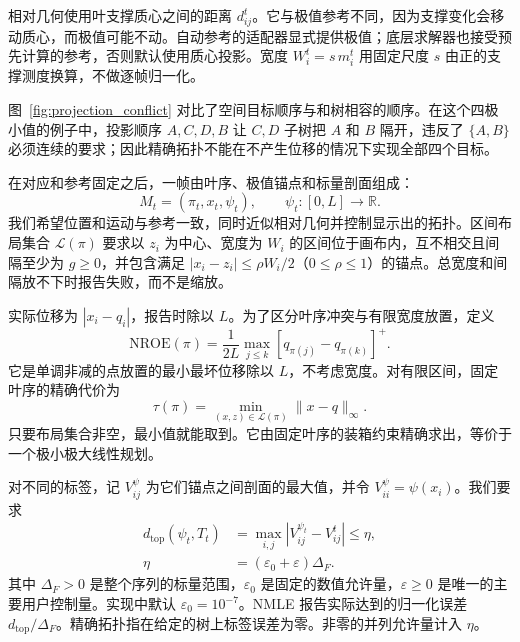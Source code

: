 \documentclass[fontset=none,zihao=5,a4paper]{ctexart}
\newcommand{\dtop}{d_{\mathrm{top}}}
\newcommand{\nroe}{\mathrm{NROE}}
\begin{document}
相对几何使用叶支撑质心之间的距离 $d_{ij}^t$。它与极值参考不同，因为支撑变化会移动质心，而极值可能不动。自动参考的适配器显式提供极值；底层求解器也接受预先计算的参考，否则默认使用质心投影。宽度 $W_i^t=s\,m_i^t$ 用固定尺度 $s$ 由正的支撑测度换算，不做逐帧归一化。

图~\ref{fig:projection_conflict} 对比了空间目标顺序与和树相容的顺序。在这个四极小值的例子中，投影顺序 $A,C,D,B$ 让 $C,D$ 子树把 $A$ 和 $B$ 隔开，违反了 $\{A,B\}$ 必须连续的要求；因此精确拓扑不能在不产生位移的情况下实现全部四个目标。

在对应和参考固定之后，一帧由叶序、极值锚点和标量剖面组成：
\begin{equation}\label{eq:mapframe}
 M_t=(\pi_t,x_t,\psi_t),\qquad\psi_t:[0,L]\to\mathbb{R}.
\end{equation}
我们希望位置和运动与参考一致，同时近似相对几何并控制显示出的拓扑。区间布局集合 $\mathcal{L}(\pi)$ 要求以 $z_i$ 为中心、宽度为 $W_i$ 的区间位于画布内，互不相交且间隔至少为 $g\ge0$，并包含满足 $|x_i-z_i|\le\rho W_i/2$（$0\le\rho\le1$）的锚点。总宽度和间隔放不下时报告失败，而不是缩放。

实际位移为 $|x_i-q_i|$，报告时除以 $L$。为了区分叶序冲突与有限宽度放置，定义
\begin{equation}\label{eq:nroe}
 \nroe(\pi)=\frac{1}{2L}\max_{j\le k}
                      [q_{\pi(j)}-q_{\pi(k)}]^+.
\end{equation}
它是单调非减的点放置的最小最坏位移除以 $L$，不考虑宽度。对有限区间，固定叶序的精确代价为
\begin{equation}\label{eq:tau}
 \tau(\pi)=\min_{(x,z)\in\mathcal{L}(\pi)}\|x-q\|_\infty.
\end{equation}
只要布局集合非空，最小值就能取到。它由固定叶序的装箱约束精确求出，等价于一个极小极大线性规划。

对不同的标签，记 $V_{ij}^{\psi}$ 为它们锚点之间剖面的最大值，并令 $V_{ii}^{\psi}=\psi(x_i)$。我们要求
\begin{equation}\label{eq:dtop}
\begin{aligned}
 \dtop(\psi_t,T_t)&=\max_{i,j}|V_{ij}^{\psi_t}-V_{ij}^t|\le\eta,\\
 \eta&=(\varepsilon_0+\varepsilon)\Delta_F.
\end{aligned}
\end{equation}
其中 $\Delta_F>0$ 是整个序列的标量范围，$\varepsilon_0$ 是固定的数值允许量，$\varepsilon\ge0$ 是唯一的主要用户控制量。实现中默认 $\varepsilon_0=10^{-7}$。NMLE 报告实际达到的归一化误差 $\dtop/\Delta_F$。精确拓扑指在给定的树上标签误差为零。非零的并列允许量计入 $\eta$。
\end{document}
